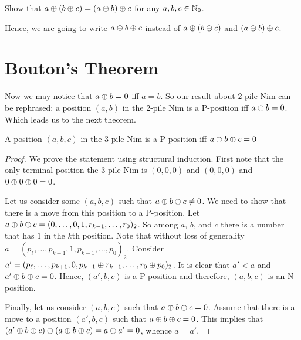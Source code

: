 \begin{exercise}
  Show that $a \oplus (b \oplus c) = (a \oplus b) \oplus c$
  for any $a, b, c \in {\mathbb{N}}_0$.
\end{exercise}
Hence, we are going to write $a \oplus b \oplus c$ instead of
$a \oplus (b \oplus c)$ and $(a \oplus b) \oplus c$.

\section{Bouton's Theorem}

Now we may notice that $a \oplus b = 0$ iff $a = b$. So
our result about $2$-pile Nim can be rephrased:
a position $(a, b)$ in the $2$-pile Nim is a P-position iff
$a \oplus b = 0$. Which leads us to the next theorem.
\begin{theorem}
  A position $(a, b, c)$ in the $3$-pile Nim is a P-position iff
  $a \oplus b \oplus c = 0$
\end{theorem}
\begin{proof}
  We prove the statement using structural induction.
  First note that the only terminal position the $3$-pile Nim is $(0, 0, 0)$
  and $(0, 0, 0)$ and $0 \oplus 0 \oplus 0 = 0$.

  Let us consider
  some $(a, b, c)$ such that $a \oplus b \oplus c \neq 0$.
  We need to show that there is a move from this position to a P-position.
  Let $a \oplus b \oplus c =
      (0, \dots, 0, 1, r_{k - 1}, \dots, r_0)_2$. So among $a$, $b$, and $c$
  there is a number that has $1$ in the $k$th position.
  Note that without loss of generality
  $a = (p_\ell, \dots, p_{k + 1}, 1, p_{k - 1}, \dots, p_0)_2$.
  Consider $a' = (p_\ell, \dots, p_{k + 1}, 0,
    p_{k - 1} \oplus r_{k - 1}, \dots, r_0 \oplus p_0)_2$. It is clear that
  $a' < a$ and $a' \oplus b \oplus c = 0$.
  Hence, $(a', b, c)$ is a P-position and therefore, $(a, b, c)$ is an
  N-position.

  Finally, let us consider $(a, b, c)$ such that
  $a \oplus b \oplus c = 0$. Assume that there is a move to a
  position $(a', b, c)$ such that $a \oplus b \oplus c = 0$.
  This implies that
  $(a' \oplus b \oplus c) \oplus
      (a \oplus b \oplus c) =  a \oplus a' = 0$, whence $a = a'$.
\end{proof}

